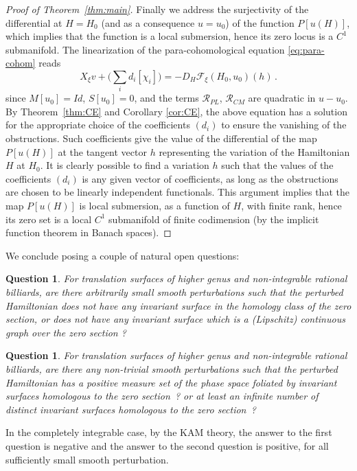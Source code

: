 \documentclass[11pt]{amsart}
\newtheorem{question}[theorem]{Question}
\begin{document}
\begin{proof} [Proof of Theorem~\ref{thm:main}]
\smallskip
Finally we address the surjectivity of the differential at $H=H_0$ (and as a consequence $u=u_0$) of the function $P [u(H)]$, which implies that the function is a local
submersion, hence its zero locus is a $C^1$ submanifold.  The linearization of the para-cohomological equation \eqref{eq:para-cohom} reads
$$
 X_\xi v  +  \Big(  \sum_i d_i [\chi_i]  \Big)     = - D_H\mathcal{F}_\xi(H_0, u_0) (h)    \,.
$$
since $M[u_0]=Id$, $S[u_0]=0$,  and the terms $\mathcal R_{PL}$, $\mathcal R_{CM}$ are quadratic in $u-u_0$.  By Theorem~\ref{thm:CE}  and Corollary \ref{cor:CE},
 the above equation has a solution for the appropriate choice of the coefficients $(d_i)$ to ensure the vanishing of the obstructions. Such coefficients give the value of the
 differential of the map $P[u(H)]$ at the tangent vector $h$ representing the variation of the Hamiltonian $H$ at $H_0$. It is clearly possible to find a variation $h$ such that
 the values of the coefficients $(d_i)$ is any given vector of coefficients,  as long as the obstructions are chosen to be linearly independent functionals. This argument implies that the
 map $P[u(H)]$ is local submersion, as a function of $H$, with finite rank, hence its zero set is a local $C^1$ submanifold of finite codimension (by the implicit function theorem
 in Banach spaces).

\end{proof}

We conclude posing a couple of natural open questions:

\begin{question}  For  translation surfaces of higher genus and non-integrable rational billiards, are there arbitrarily small smooth perturbations such that the perturbed Hamiltonian does not have any 
invariant surface in the homology class of the zero section, or does not have any invariant surface which is a (Lipschitz) continuous graph over the zero section ?
\end{question}

\begin{question} For translation surfaces of higher genus and non-integrable rational billiards, are there any non-trivial smooth perturbations such that the perturbed Hamiltonian has a positive measure set
of the phase space foliated by invariant surfaces homologous to the zero section~? or at least an infinite number of distinct invariant surfaces homologous to the zero section~?
\end{question} 

In the completely integrable case,  by the KAM theory, the answer to the first question is negative and the answer to the second question is positive, for all sufficiently small smooth perturbation.
\end{document}
